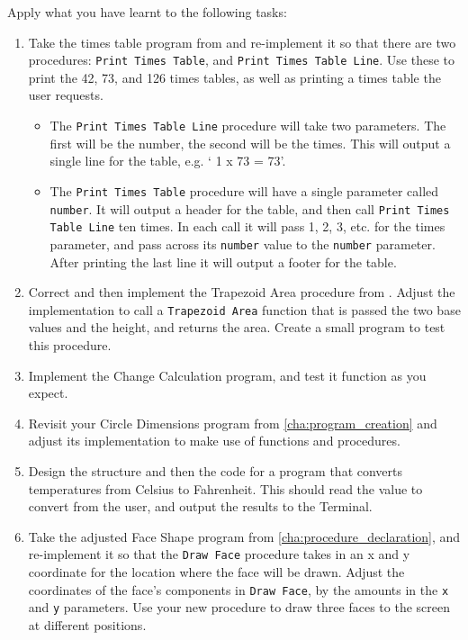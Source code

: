 \clearpage
Apply what you have learnt to the following tasks:
\begin{enumerate}
  \item Take the times table program from  and re-implement it so that there are two procedures: \texttt{Print Times Table}, and \texttt{Print Times Table Line}. Use these to print the 42, 73, and 126 times tables, as well as printing a times table the user requests.
  \begin{itemize}
    \item The \texttt{Print Times Table Line} procedure will take two parameters. The first will be the number, the second will be the times. This will output a single line for the table, e.g. ` 1 x 73 = 73'. 
    \item The \texttt{Print Times Table} procedure will have a single parameter called \texttt{number}. It will output a header for the table, and then call \texttt{Print Times Table Line} ten times. In each call it will pass 1, 2, 3, etc. for the times parameter, and pass across its \texttt{number} value to the \texttt{number} parameter. After printing the last line it will output a footer for the table.
  \end{itemize}
  \item Correct and then implement the Trapezoid Area procedure from . Adjust the implementation to call a \texttt{Trapezoid Area} function that is passed the two base values and the height, and returns the area. Create a small program to test this procedure.
  \item Implement the Change Calculation program, and test it function as you expect.
  \item Revisit your Circle Dimensions program from \cref{cha:program_creation} and adjust its implementation to make use of functions and procedures.
  \item Design the structure and then the code for a program that converts temperatures from Celsius to Fahrenheit. This should read the value to convert from the user, and output the results to the Terminal.
  \item Take the adjusted Face Shape program from \cref{cha:procedure_declaration}, and re-implement it so that the \texttt{Draw Face} procedure takes in an x and y coordinate for the location where the face will be drawn. Adjust the coordinates of the face's components in \texttt{Draw Face}, by the amounts in the \texttt{x} and \texttt{y} parameters. Use your new procedure to draw three faces to the screen at different positions.

\end{enumerate}
